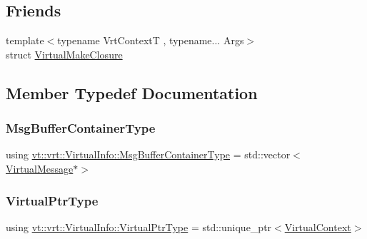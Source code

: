\subsection*{Friends}
\begin{DoxyCompactItemize}
\item 
{\footnotesize template$<$typename Vrt\+ContextT , typename... Args$>$ }\\struct \hyperlink{structvt_1_1vrt_1_1_virtual_info_a6d27b32cd35d056a4d8bf6ba43f28f62}{Virtual\+Make\+Closure}
\end{DoxyCompactItemize}


\subsection{Member Typedef Documentation}
\mbox{\label{structvt_1_1vrt_1_1_virtual_info_a58e94aae79e1e8f0bb4c2bf6c7ba608e}} 
\subsubsection{\texorpdfstring{Msg\+Buffer\+Container\+Type}{MsgBufferContainerType}}
{\footnotesize\ttfamily using \hyperlink{structvt_1_1vrt_1_1_virtual_info_a58e94aae79e1e8f0bb4c2bf6c7ba608e}{vt\+::vrt\+::\+Virtual\+Info\+::\+Msg\+Buffer\+Container\+Type} =  std\+::vector$<$\hyperlink{structvt_1_1vrt_1_1_virtual_message}{Virtual\+Message}$\ast$$>$}

\mbox{\label{structvt_1_1vrt_1_1_virtual_info_aede28e76785423dd2685fe4cf54afa21}} 
\subsubsection{\texorpdfstring{Virtual\+Ptr\+Type}{VirtualPtrType}}
{\footnotesize\ttfamily using \hyperlink{structvt_1_1vrt_1_1_virtual_info_aede28e76785423dd2685fe4cf54afa21}{vt\+::vrt\+::\+Virtual\+Info\+::\+Virtual\+Ptr\+Type} =  std\+::unique\+\_\+ptr$<$\hyperlink{structvt_1_1vrt_1_1_virtual_context}{Virtual\+Context}$>$}



